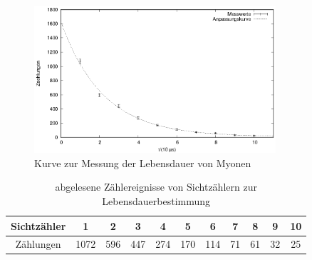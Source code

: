\begin{figure}[h]
  \centering
  \includegraphics[width=0.8\textwidth]{./data/lebensdauer.eps}
  \caption{Kurve zur Messung der Lebensdauer von Myonen}
  \label{fig:lebensdauer}
\end{figure}


\begin{table}[h]
    \centering
    \caption{abgelesene Zählereignisse von Sichtzählern zur Lebensdauerbestimmung}
    \label{tab:sichtzaehler}
    \begin{tabular}{c | c c c c c c c c c c}
      Sichtzähler &1&2&3&4&5&6&7&8&9&10\\ \hline
      Zählungen &1072&596&447&274&170&114&71&61&32&25\\
    \end{tabular}
  \end{table}
